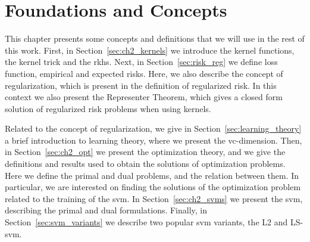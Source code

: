 
\chapter{Foundations and Concepts} %
\label{Chapter2}

{\bf \small{
}}








This chapter presents some concepts and definitions that we will use in the rest of this work.
First, in Section~\ref{sec:ch2_kernels} we introduce the kernel functions, the kernel trick and the \acrfull{rkhs}.
Next, in Section~\ref{sec:risk_reg} we define loss function, empirical and expected risks. Here, we also describe the concept of regularization, which is present in the definition of regularized risk. In this context we also present the Representer Theorem, which gives a closed form solution of regularized risk problems when using kernels.

Related to the concept of regularization, we give in Section~\ref{sec:learning_theory} a brief introduction to learning theory, where we present the \acrfull{vc}-dimension.
Then, in Section~\ref{sec:ch2_opt} we present the optimization theory, and we give the definitions and results used to obtain the solutions of optimization problems. Here we define the primal and dual problems, and the relation between them.
In particular, we are interested on finding the solutions of the optimization problem related to the training of the \acrfull{svm}. In Section~\ref{sec:ch2_svms} we present the \acrshort{svm}, describing the primal and dual formulations. 
Finally, in Section~\ref{sec:svm_variants} we describe two popular \acrshort{svm} variants, the L2 and LS-\acrshort{svm}.



